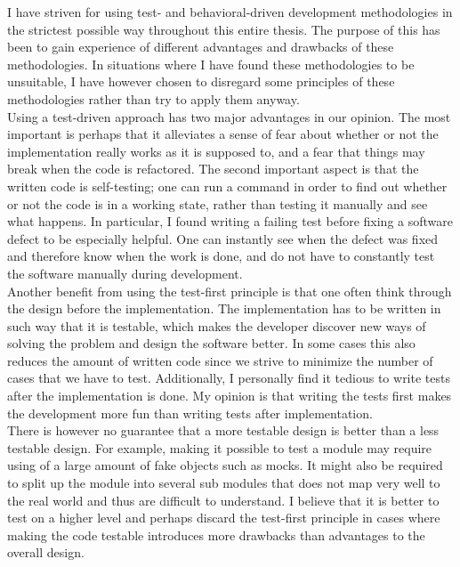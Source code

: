 
I have striven for using test- and behavioral-driven development
methodologies in the strictest possible way throughout this entire
thesis. The purpose of this has been to gain experience of different
advantages and drawbacks of these methodologies. In situations where I
have found these methodologies to be unsuitable, I have however chosen
to disregard some principles of these methodologies rather than try to
apply them anyway.\\

Using a test-driven approach has two major advantages in our opinion.
The most important is perhaps that it alleviates a sense of fear about
whether or not the implementation really works as it is supposed to, and
a fear that things may break when the code is refactored. The second
important aspect is that the written code is self-testing; one can run a
command in order to find out whether or not the code is in a working
state, rather than testing it manually and see what happens. In
particular, I found writing a failing test before fixing a software
defect to be especially helpful. One can instantly see when the defect
was fixed and therefore know when the work is done, and do not have to
constantly test the software manually during development.\\

Another benefit from using the test-first principle is that one often
think through the design before the implementation. The implementation
has to be written in such way that it is testable, which makes the
developer discover new ways of solving the problem and design the
software better. In some cases this also reduces the amount of written
code since we strive to minimize the number of cases that we have to
test. Additionally, I personally find it tedious to write tests after
the implementation is done. My opinion is that writing the tests first
makes the development more fun than writing tests after
implementation.\\

There is however no guarantee that a more testable design is better than
a less testable design. For example, making it possible to test a
module may require using of a large amount of fake objects such as
mocks. It might also be required to split up the module into several sub
modules that does not map very well to the real world and thus are
difficult to understand. I believe that it is better to test on a
higher level and perhaps discard the test-first principle in cases where
making the code testable introduces more drawbacks than advantages to
the overall design.\\

